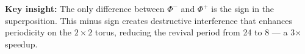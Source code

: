 \textbf{Key insight:} The only difference between $\Phi^-$ and
$\Phi^+$ is the sign in the superposition. This minus sign creates
destructive interference that enhances periodicity on the
$2 \times 2$ torus, reducing the revival period from 24 to 8 --- a
3$\times$ speedup.
